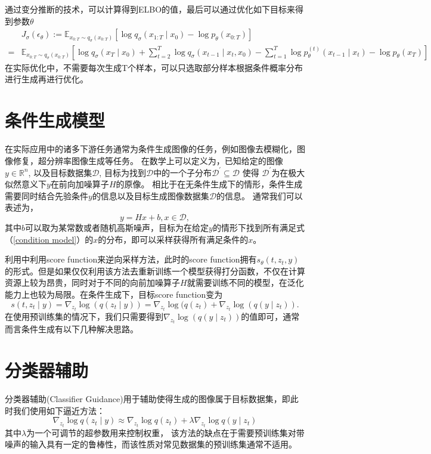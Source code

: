 通过变分推断的技术，可以计算得到ELBO的值，最后可以通过优化如下目标来得到参数$\theta$
\begin{align} & J_\sigma\left(\epsilon_\theta\right):=\mathbb{E}_{{x}_{0: T} \sim q_\sigma\left({x}_{0: T}\right)}\left[\log q_\sigma\left({x}_{1: T} \mid {x}_0\right)-\log p_\theta\left({x}_{0: T}\right)\right] \\ = & \mathbb{E}_{{x}_{0: T} \sim q_\sigma\left({x}_{0: T}\right)}\left[\log q_\sigma\left({x}_T \mid {x}_0\right)+\sum_{t=2}^T \log q_\sigma\left({x}_{t-1} \mid {x}_t, {x}_0\right)-\sum_{t=1}^T \log p_\theta^{(t)}\left({x}_{t-1} \mid {x}_t\right)-\log p_\theta\left({x}_T\right)\right]\end{align}
在实际优化中，不需要每次生成T个样本，可以只选取部分样本根据条件概率分布进行生成再进行优化。
\section{条件生成模型}
在实际应用中的诸多下游任务通常为条件生成图像的任务，例如图像去模糊化，图像修复，超分辨率图像生成等任务。 在数学上可以定义为，已知给定的图像$y\in \mathbb{R}^n$, 以及目标数据集$\mathcal{D}$, 目标为找到$\mathcal{D}$中的一个子分布$\mathcal{D}^{\prime}\subseteq \mathcal{D}$ 使得 $\mathcal{D}^{\prime}$为在极大似然意义下$y$在前向加噪算子$H$的原像。 相比于在无条件生成下的情形，条件生成需要同时结合先验条件$y$的信息以及目标生成图像数据集$\mathcal{D}$的信息。 通常我们可以表述为，
\begin{equation}
    y = Hx +b ,  x\in \mathcal{D},\label{condition model}
\end{equation}
其中$b$可以取为某常数或者随机高斯噪声，目标为在给定$y$的情形下找到所有满足式（\ref{condition model}）的$x$的分布，即可以采样获得所有满足条件的$x$。      


利用\cite{score_based_SDE,song_2}中利用score function来逆向采样方法，此时的score function拥有$s_{\theta}(t,z_t,y)$的形式。但是如果仅仅利用该方法去重新训练一个模型获得打分函数，不仅在计算资源上较为昂贵，同时对于不同的向前加噪算子$H$就需要训练不同的模型，在泛化能力上也较为局限。在条件生成下，目标score function变为
\begin{equation}
    s(t,z_t\mid y) = \nabla_{z_t}\log\left(q(z_t\mid y)\right)= \nabla_{z_t}\log(q(z_t)+\nabla_{z_t}\log \left(q(y\mid z_t)\right).
    \label{Bayes transformation}
\end{equation}
在使用预训练集的情况下，我们只需要得到$\nabla_{z_t}\log(q(y\mid z_t))$的值即可，通常而言条件生成有以下几种解决思路。

\section{分类器辅助 }
\label{classifier guidance}
分类器辅助(Classifier Guidance)用于辅助使得生成的图像属于目标数据集，即此时我们使用如下逼近方法：
\begin{equation}
    \nabla_{{z}_t} \log q\left({z}_t \mid y\right)\approx \nabla_{{z}_t} \log q\left({z}_t\right)+\lambda \nabla_{{z}_t} \log q\left(y \mid {z}_t\right)
\end{equation}
其中$\lambda$为一个可调节的超参数用来控制权重， 该方法的缺点在于需要预训练集对带噪声的输入具有一定的鲁棒性，而该性质对常见数据集的预训练集通常不适用。 


